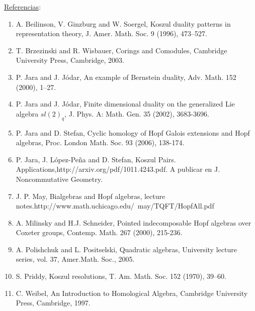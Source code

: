 \documentclass[a4paper,12pt]{article}
\begin{document}
\underline{Referencias}:
\begin{enumerate}[nosep, label=(\arabic*)]%
\item
A. Beilinson, V. Ginzburg and W. Soergel, Koszul duality patterns in representation theory, J. Amer. Math. Soc. 9 (1996), 473--527.
\item
T. Brzezinski and R. Wisbauer, Corings and Comodules, Cambridge University Press, Cambridge, 2003.
\item
P. Jara and J. J\'{o}dar, An example of Bernstein duality, Adv. Math. 152 (2000), 1--27.
\item
P. Jara and J. J\'{o}dar, Finite dimensional duality on the generalized Lie algebra $sl(2)_q$, J. Phys. A: Math. Gen. 35 (2002), 3683-3696.
\item
P. Jara and D. Stefan, Cyclic homology of Hopf Galois extensions and Hopf algebras, Proc. London Math. Soc. 93 (2006), 138-174.
\item
P. Jara, J. L\'{o}pez-Pe\~{n}a and D. Stefan, Koszul Pairs. Applications,\newline http://arxiv.org/pdf/1011.4243.pdf. A publicar en J. Noncommutative Geometry.
\item
J. P. May, Bialgebras and Hopf algebras, lecture notes.\newline http://www.math.uchicago.edu/~may/TQFT/HopfAll.pdf
\item
A. Milinsky and H.J. Schneider, Pointed indecomposable Hopf algebras over Coxeter groups, Contemp. Math. 267 (2000), 215-236.
\item
A. Polishchuk and L. Positselski, Quadratic algebras, University lecture series, vol. 37, Amer.Math. Soc., 2005.
\item
S. Priddy, Koszul resolutions, T. Am. Math. Soc. 152 (1970), 39--60.
\item
C. Weibel, An Introduction to Homological Algebra, Cambridge University Press, Cambridge, 1997.
\end{enumerate}
\end{document}
